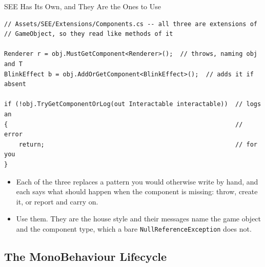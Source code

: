 \begin{frame}[fragile]{SEE Has Its Own, and They Are the Ones to Use}
  \begin{lstlisting}[basicstyle=\scriptsize\ttfamily]
// Assets/SEE/Extensions/Components.cs -- all three are extensions of
// GameObject, so they read like methods of it

Renderer r = obj.MustGetComponent<Renderer>();  // throws, naming obj and T
BlinkEffect b = obj.AddOrGetComponent<BlinkEffect>();  // adds it if absent

if (!obj.TryGetComponentOrLog(out Interactable interactable))  // logs an
{                                                              // error
    return;                                                    // for you
}
  \end{lstlisting}
  \vspace{1ex}

  \begin{itemize}
    \item Each of the three replaces a pattern you would otherwise write by
      hand, and each says what should happen when the component is missing:
      throw, create it, or report and carry on.
    \item Use them. They are the house style and their messages name the game
      object and the component type, which a bare
      \texttt{NullReferenceException} does not.
  \end{itemize}
\end{frame}

\subsection{The MonoBehaviour Lifecycle}


